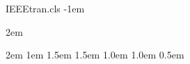 \begin{filecontents*}[overwrite]{IEEEtran.cls}
\itemindent         -1em

\leftmargin         2em

\leftmargini        2em
\leftmarginii       1em
\leftmarginiii    1.5em
\leftmarginiv     1.5em
\leftmarginv      1.0em
\leftmarginvi     1.0em
         0.5em 
         \z@


% 
\def\@listi{\leftmargin\leftmargini \topsep 2pt plus 1pt minus 1pt}
\let\@listI\@listi
\def\@listii{\leftmargin\leftmarginii\labelwidth\leftmarginii%
    \advance\labelwidth-\labelsep \topsep 2pt}
\def\@listiii{\leftmargin\leftmarginiii\labelwidth\leftmarginiii%
    \advance\labelwidth-\labelsep \topsep 2pt}
\def\@listiv{\leftmargin\leftmarginiv\labelwidth\leftmarginiv%
    \advance\labelwidth-\labelsep \topsep 2pt}
\def\@listv{\leftmargin\leftmarginv\labelwidth\leftmarginv%
    \advance\labelwidth-\labelsep \topsep 2pt}
\def\@listvi{\leftmargin\leftmarginvi\labelwidth\leftmarginvi%
    \advance\labelwidth-\labelsep \topsep 2pt}


\def\labelenumi{\theenumi)}     \def\theenumi{\arabic{enumi}}

\def\labelenumii{\theenumii)}  \def\theenumii{\alph{enumii}}


\end{filecontents*}
